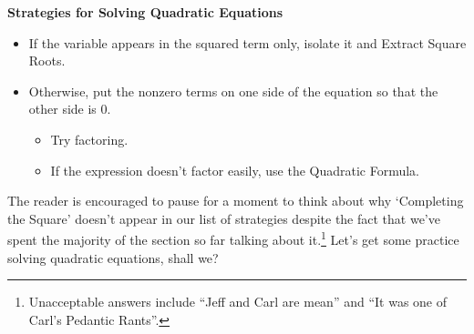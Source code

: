 \documentclass[11pt]{article}
\theoremstyle{definition}  %
\newcommand{\bbm}{\begin{boxedminipage}{6.41in}}
\newcommand{\ebm}{\end{boxedminipage}}
\begin{document}
\colorbox{ResultColor}{\bbm
\centerline{\textbf{Strategies for Solving Quadratic Equations}}

\begin{itemize}

\item  If the variable appears in the squared term only, isolate it and Extract Square Roots.
\item  Otherwise, put the nonzero terms on one side of the equation so that the other side is $0$.
\begin{itemize}
\item  Try factoring.  
\item  If the expression doesn't factor easily, use the Quadratic Formula.

\end{itemize}
\end{itemize}

\ebm}

\medskip

The reader is encouraged to pause for a moment to think about why `Completing the Square' doesn't appear in our list of strategies despite the fact that we've spent the majority of the section so far talking about it.\footnote{Unacceptable answers include ``Jeff and Carl are mean'' and ``It was one of Carl's Pedantic Rants''.}  Let's get some practice solving quadratic equations, shall we?
\end{document}
